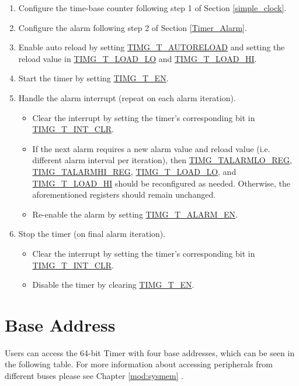 \documentclass[main\_\_EN.tex]{subfiles}
\begin{document}
\begin{enumerate}
    \item Configure the time-base counter following step 1 of Section \ref{simple_clock}.
    \item Configure the alarm following step 2 of Section \ref{Timer_Alarm}.
    \item Enable auto reload by setting \hyperref[fielddesc:TIMGTXAUTORELOAD]{TIMG\_T\_AUTORELOAD} and setting the reload value in \hyperref[fielddesc:TIMGTXLOADLO]{TIMG\_T\_LOAD\_LO} and \hyperref[fielddesc:TIMGTXLOADHI]{TIMG\_T\_LOAD\_HI}.
    \item Start the timer by setting \hyperref[fielddesc:TIMGTXEN]{TIMG\_T\_EN}.
    \item Handle the alarm interrupt (repeat on each alarm iteration).
    \begin{itemize}
        \item Clear the interrupt by setting the timer's corresponding bit in \hyperref[fielddesc:TIMGTXINTCLR]{TIMG\_T\_INT\_CLR}.
        \item If the next alarm requires a new alarm value and reload value (i.e. different alarm interval per iteration), then \hyperref[regdesc:TIMGTXALARMLOREG]{TIMG\_TALARMLO\_REG}, \hyperref[regdesc:TIMGTXALARMHIREG]{TIMG\_TALARMHI\_REG}, \hyperref[fielddesc:TIMGTXLOADLO]{TIMG\_T\_LOAD\_LO}, and \\\hyperref[fielddesc:TIMGTXLOADHI]{TIMG\_T\_LOAD\_HI} should be reconfigured as needed. Otherwise, the aforementioned registers should remain unchanged.
        \item Re-enable the alarm by setting \hyperref[fielddesc:TIMGTXALARMEN]{TIMG\_T\_ALARM\_EN}.
    \end{itemize}
    \item Stop the timer (on final alarm iteration).
    \begin{itemize}
        \item Clear the interrupt by setting the timer's corresponding bit in \hyperref[fielddesc:TIMGTXINTCLR]{TIMG\_T\_INT\_CLR}.
        \item Disable the timer by clearing \hyperref[fielddesc:TIMGTXEN]{TIMG\_T\_EN}.
    \end{itemize}
\end{enumerate}

\section{Base Address}\label{subsection:timer base address}
Users can access the 64-bit Timer with four base addresses, which can be seen in the following table. For more information about accessing peripherals from different buses please see Chapter \ref{mod:sysmem} \textit{}.
\end{document}
